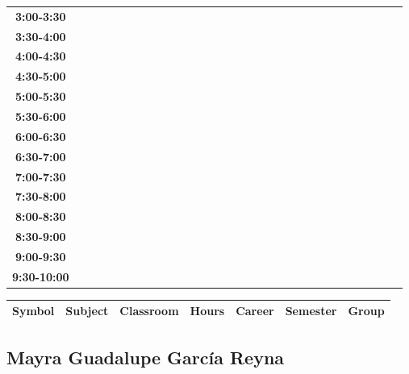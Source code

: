 \documentclass{article}
\begin{document}
\begin{table}[ht]
\begin{tabular}{|c|c|c|c|c|c|c|c|c|c|c|c|c|c|c|c|c|c|c|c|c|c|c|c|c|c|c|c|c|c|}
\textbf{3:00-3:30} &   &   &   &   &   &   &   \\
 \cline{1-8} 
\textbf{3:30-4:00} &   &   &   &   &   &   &   \\
 \cline{1-8} 
\textbf{4:00-4:30} &   &   &   &   &   &   &   \\
 \cline{1-8} 
\textbf{4:30-5:00} &   &   &   &   &   &   &   \\
 \cline{1-8} 
\textbf{5:00-5:30} &   &   &   &   &   &   &   \\
 \cline{1-8} 
\textbf{5:30-6:00} &   &   &   &   &   &   &   \\
 \cline{1-8} 
\textbf{6:00-6:30} &   &   &   &   &   &   &   \\
 \cline{1-8} 
\textbf{6:30-7:00} &   &   &   &   &   &   &   \\
 \cline{1-8} 
\textbf{7:00-7:30} &   &   &   &   &   &   &   \\
 \cline{1-8} 
\textbf{7:30-8:00} &   &   &   &   &   &   &   \\
 \cline{1-8} 
\textbf{8:00-8:30} &   &   &   &   &   &   &   \\
 \cline{1-8} 
\textbf{8:30-9:00} &   &   &   &   &   &   &   \\
 \cline{1-8} 
\textbf{9:00-9:30} &   &   &   &   &   &   &   \\
 \cline{1-8} 
\textbf{9:30-10:00} &   &   &   &   &   &   &   \\
 \cline{1-8} 
\end{tabular}\end{table}

        
        \begin{tabular}{|>{\centering\arraybackslash}m{2cm}|>{\centering\arraybackslash}m{4cm}|>{\centering\arraybackslash}m{2cm}|>{\centering\arraybackslash}m{2cm}|>{\centering\arraybackslash}m{2cm}|>{\centering\arraybackslash}m{2cm}|>{\centering\arraybackslash}m{2cm}|}
        \hline
        \textbf{Symbol} & \textbf{Subject} & \textbf{Classroom} & \textbf{Hours} & \textbf{Career} & \textbf{Semester} & \textbf{Group} \\
        \hline
        \end{tabular}
                    

        \newpage
        

        \subsection{Mayra Guadalupe Garc\'ia Reyna}
        \vspace*{.1cm}
        
\end{document}
